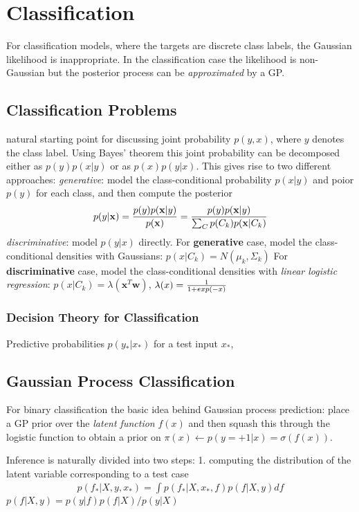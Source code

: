 \documentclass[a4paper]{article}
\begin{document}
\section{Classification}

For classification models, where the targets are discrete class labels, the Gaussian likelihood is inappropriate.
In the classification case the likelihood is non-Gaussian but the posterior process can be \emph{approximated} by a GP.

\subsection{Classification Problems}
natural starting point for discussing joint probability $p(y, x)$, where $y$ denotes the class label. Using Bayes’ theorem this joint probability can be decomposed either as $p(y)p(x|y)$ or as $p(x)p(y|x)$. This gives rise to two different approaches:
\emph{generative}: model the class-conditional probability $p(x|y)$ and poior $p(y)$ for each class, and then compute the posterior
\begin{align}
  p(y|\mathbf{x}) = { p(y)p(\mathbf{x}|y) \over p(\mathbf{x})} = {p(y)p(\mathbf{x}|y) \over \sum_C p(C_k)p(\mathbf{x}|C_k) }
\end{align}
\emph{discriminative}: model $p(y|x)$ directly.
For \textbf{generative} case, model the class-conditional densities with Gaussians: $p(x|C_k) = N(\mu_k, \Sigma_k)$
For \textbf{discriminative} case, model the class-conditional densities with \emph{linear logistic regression}: $p(x|C_k) = \lambda(\mathbf{x}^T\mathbf{w})$, $\lambda(x) = {1 \over 1+exp(-x)} $

\subsubsection{Decision Theory for Classification}
Predictive probabilities $p(y_* |x_*)$ for a test input $x_*$,

\subsection{Gaussian Process Classification}
For binary classification the basic idea behind Gaussian process prediction:
place a GP prior over the \emph{latent function} $f(x)$ and then squash this through the logistic function to obtain a prior on $\pi(x) \gets  p(y=+1|x) = \sigma(f(x))$.

Inference is naturally divided into two steps:
1. computing the distribution of the latent variable corresponding to a test case
\begin{align}
  p(f_*|X,y,x_*) = \int p(f_*|X,x_*,f)p(f|X,y) df
\end{align}
$p(f|X,y) = p(y|f)p(f|X)/p(y|X)$
\end{document}
